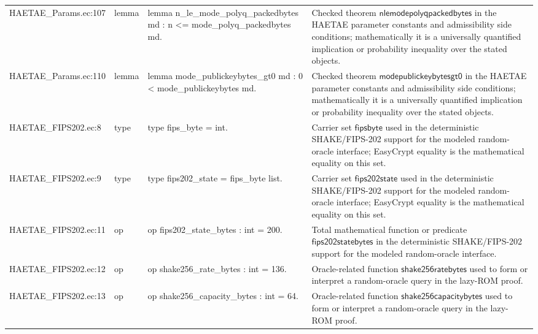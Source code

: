 \documentclass[10pt]{article}
\begin{document}
\begin{longtable}{L{0.11\textwidth}L{0.055\textwidth}L{0.385\textwidth}L{0.41\textwidth}}
HAETAE\_\allowbreak{}Params.\allowbreak{}ec:\allowbreak{}107 & lemma & {\ttfamily\scriptsize lemma n\_\allowbreak{}le\_\allowbreak{}mode\_\allowbreak{}polyq\_\allowbreak{}packedbytes md : n \textless{}= mode\_\allowbreak{}polyq\_\allowbreak{}packedbytes md.} & Checked theorem $\mathsf{nlemodepolyqpackedbytes}$ in the HAETAE parameter constants and admissibility side conditions; mathematically it is a universally quantified implication or probability inequality over the stated objects. \\
HAETAE\_\allowbreak{}Params.\allowbreak{}ec:\allowbreak{}110 & lemma & {\ttfamily\scriptsize lemma mode\_\allowbreak{}publickeybytes\_\allowbreak{}gt0 md : 0 \textless{} mode\_\allowbreak{}publickeybytes md.} & Checked theorem $\mathsf{modepublickeybytesgt0}$ in the HAETAE parameter constants and admissibility side conditions; mathematically it is a universally quantified implication or probability inequality over the stated objects. \\
HAETAE\_\allowbreak{}FIPS202.\allowbreak{}ec:\allowbreak{}8 & type & {\ttfamily\scriptsize type fips\_\allowbreak{}byte = int.} & Carrier set $\mathsf{fipsbyte}$ used in the deterministic SHAKE/FIPS-202 support for the modeled random-oracle interface; EasyCrypt equality is the mathematical equality on this set. \\
HAETAE\_\allowbreak{}FIPS202.\allowbreak{}ec:\allowbreak{}9 & type & {\ttfamily\scriptsize type fips202\_\allowbreak{}state = fips\_\allowbreak{}byte list.} & Carrier set $\mathsf{fips202state}$ used in the deterministic SHAKE/FIPS-202 support for the modeled random-oracle interface; EasyCrypt equality is the mathematical equality on this set. \\
HAETAE\_\allowbreak{}FIPS202.\allowbreak{}ec:\allowbreak{}11 & op & {\ttfamily\scriptsize op fips202\_\allowbreak{}state\_\allowbreak{}bytes : int = 200.} & Total mathematical function or predicate $\mathsf{fips202statebytes}$ in the deterministic SHAKE/FIPS-202 support for the modeled random-oracle interface. \\
HAETAE\_\allowbreak{}FIPS202.\allowbreak{}ec:\allowbreak{}12 & op & {\ttfamily\scriptsize op shake256\_\allowbreak{}rate\_\allowbreak{}bytes : int = 136.} & Oracle-related function $\mathsf{shake256ratebytes}$ used to form or interpret a random-oracle query in the lazy-ROM proof. \\
HAETAE\_\allowbreak{}FIPS202.\allowbreak{}ec:\allowbreak{}13 & op & {\ttfamily\scriptsize op shake256\_\allowbreak{}capacity\_\allowbreak{}bytes : int = 64.} & Oracle-related function $\mathsf{shake256capacitybytes}$ used to form or interpret a random-oracle query in the lazy-ROM proof. \\

\end{longtable}
\end{document}
